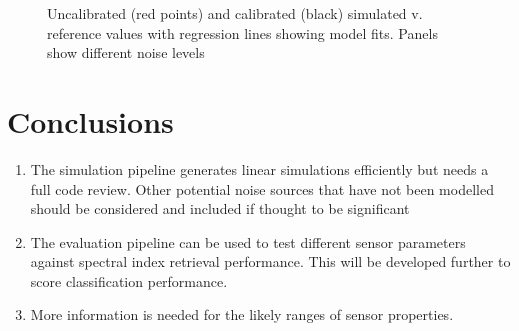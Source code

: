 \documentclass[10pt,a4paper,final,twocolumn]{article}
\begin{document}
\begin{figure*}
\caption{Uncalibrated (red points) and calibrated (black) simulated v. reference values with regression lines showing model fits. Panels show different noise levels}
\label{fig:cal}
\end{figure*}

\section{Conclusions}
\begin{enumerate}
\item The simulation pipeline generates linear simulations efficiently but needs a full code review. Other potential noise sources that have not been modelled should be considered and included if thought to be significant
\item The evaluation pipeline can be used to test different sensor parameters against spectral index retrieval performance. This will be developed further to score classification performance.
\item More information is needed for the likely ranges of sensor properties.
\end{enumerate}


\end{document}
